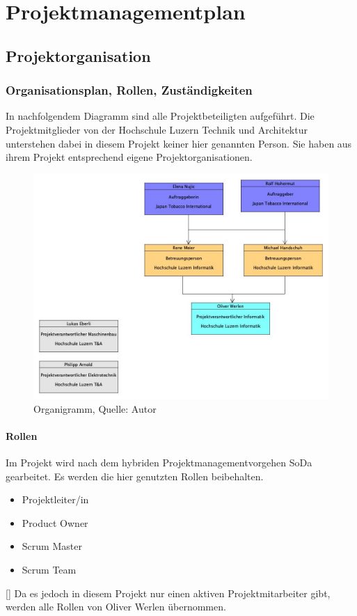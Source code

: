 
\section{Projektmanagementplan}\label{Projektmanagementplan}

\subsection{Projektorganisation}
\subsubsection{Organisationsplan, Rollen, Zuständigkeiten}
In nachfolgendem Diagramm sind alle Projektbeteiligten aufgeführt. Die Projektmitglieder von der Hochschule Luzern Technik und Architektur unterstehen dabei in diesem Projekt keiner hier genannten Person. Sie haben aus ihrem Projekt entsprechend eigene Projektorganisationen. 
\begin{figure}[H]
    \centering
    \includegraphics[width=1\textwidth]{images/Organigramm_BAA.jpg}
    \caption[Organigramm]{Organigramm, Quelle: Autor}
    \label{img: OrganigrammWiPro}
\end{figure}	

\paragraph{Rollen}
Im Projekt wird nach dem hybriden Projektmanagementvorgehen \ac{SoDa} gearbeitet. Es werden die hier genutzten Rollen beibehalten. 
\begin{itemize}
	\item Projektleiter/in
	\item Product Owner
	\item Scrum Master
	\item Scrum Team
\end{itemize}
[\cite{sodaHSLU}]
Da es jedoch in diesem Projekt nur einen aktiven Projektmitarbeiter gibt, werden alle Rollen von Oliver Werlen übernommen. 
